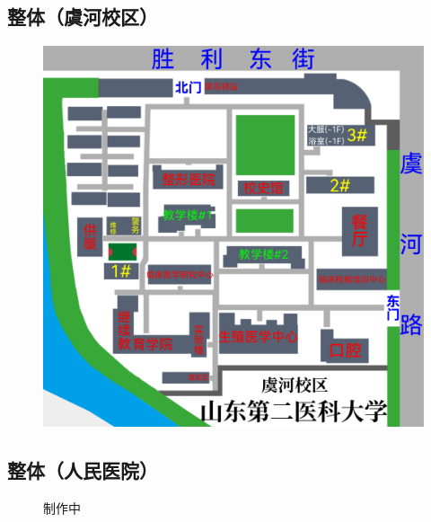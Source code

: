 \subsection[整体（虞河校区）]{整体（虞河校区）}
\noindent\begin{figure}[H]
    \centering
    \vspace{1em}
    \noindent\includegraphics*[width=\linewidth]{虞河校区地图.pdf}
    \label{map_y}
\end{figure}

\newpage
\subsection[整体（人民医院）]{整体（人民医院）}
\noindent\begin{figure}[H]
    \centering
    \vspace{1em}
    制作中
    \label{map_h}
\end{figure}
